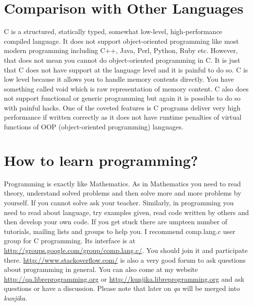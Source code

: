 \section{Comparison with Other Languages}
C is a structured, statically typed, somewhat low-level, high-performance
compiled language. It does not support object-oriented programming like most
modern programming including C++, Java, Perl, Python, Ruby etc. However, that
does not mean you cannot do object-oriented programming in C. It is just that C
does not have support at the language level and it is painful to do so. C is
low level because it allows you to handle memory contents directly. You have
something called void which is raw representation of memory content. C also
does not support functional or generic programming but again it is possible to
do so with painful hacks. One of the coveted features is C programs deliver
very high performance if written correctly as it does not have runtime
penalties of virtual functions of OOP (object-oriented programming) languages.

\section{How to learn programming?}
Programming is exactly like Mathematics. As in Mathematics you need to read
theory, understand solved problems and then solve more and more problems by
yourself. If you cannot solve ask your teacher. Similarly, in programming you
need to read about language, try examples given, read code written by others
and then develop your own code. If you get stuck there are umpteen number of
tutorials, mailing lists and groups to help you. I recommend comp.lang.c user
group for C programming. Its interface is at
\url{http://groups.google.com/group/comp.lang.c/}. You should join it and
participate there. \url{http://www.stackoverflow.com/} is also a very good
forum to ask questions about programming in general. You can also come at my
website \url{http://qa.libreprogramming.org} or
\url{http://kunjika.libreprogramming.org} and ask questions or have a
discussion. Please note that later on \textit{qa} will be merged into
\textit{kunjika}.

